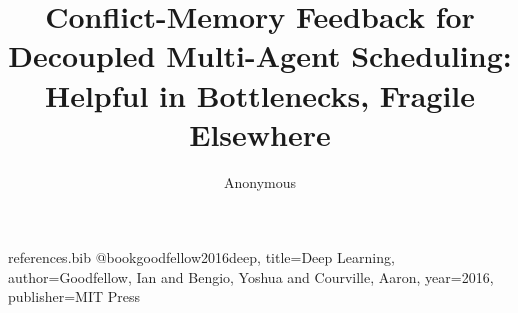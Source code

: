 \begin{filecontents*}{references.bib}
@book{goodfellow2016deep,
  title={Deep Learning},
  author={Goodfellow, Ian and Bengio, Yoshua and Courville, Aaron},
  year={2016},
  publisher={MIT Press}
}
\end{filecontents*}

\documentclass{article} %
\usepackage{iclr2025,times}



\usepackage{hyperref}
\usepackage{url}
\usepackage{graphicx}
\usepackage{booktabs}
\usepackage{amsmath}
\usepackage{amssymb}
\usepackage{mathtools}
\usepackage[capitalize,noabbrev]{cleveref}

\graphicspath{{../figures/}} %

\title{
Conflict-Memory Feedback for Decoupled Multi-Agent Scheduling:\\
Helpful in Bottlenecks, Fragile Elsewhere
}

\author{Anonymous}



\maketitle

\begin{abstract}
Decoupled multi-agent scheduling is attractive because task assignment can be solved cheaply before path planning, but this modularity ignores downstream congestion. We study whether a lightweight ``conflict memory'' can feed congestion information back into assignment without full joint optimization. Our intended idea was to learn from MAPF conflict logs, but the current prototype only realizes a weaker proxy: a CNN predicts short-horizon congestion maps from agent and task occupancy, and the predicted path congestion is added to a greedy assignment cost. In three synthetic warehouse layouts, this proxy sometimes helps. The best setting, selected by end-task utility rather than predictor loss, improves mean throughput by about 7.1\% over a standard decoupled baseline. However, the gains are highly uneven: improvements are concentrated in bottlenecked and dense-obstacle layouts at medium load, while sparse layouts remain near zero and several low-load settings become worse than the baseline. A particularly important pitfall is that the lowest validation loss occurs at 60 epochs, whereas the best scheduling performance occurs at 30 epochs. Our conclusion is therefore mixed: reusable congestion structure does exist, but learning a good congestion predictor is easier than turning it into a robust allocation signal.
\end{abstract}

